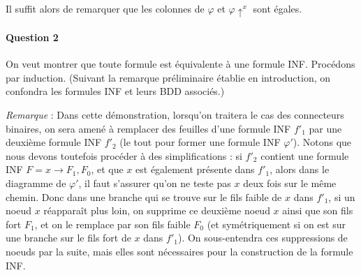 \documentclass[a4paper,11pt]{article}
\begin{document}
		Il suffit alors de remarquer que les colonnes de $\varphi$ et $\varphi\uparrow^{x}$ sont égales.
		
		\paragraph{Question 2}
	
		
		
		On veut montrer que toute formule est équivalente à une formule INF.
		Procédons par induction.
		(Suivant la remarque préliminaire établie en introduction, on confondra les formules INF et leurs BDD associés.)
		
		\emph{Remarque} :  Dans cette démonstration, lorsqu'on traitera le cas des connecteurs binaires, on sera amené à remplacer des feuilles d'une formule INF ${f'}_1$ par une deuxième formule INF ${f'}_2$ (le tout pour former une formule INF $\varphi'$).
		Notons que nous devons toutefois procéder à des simplifications : si ${f'}_2$ contient une formule INF $F = x \rightarrow F_1,F_0$, et que $x$ est également présente dans ${f'}_1$, alors dans le diagramme de $\varphi'$, il faut s'assurer qu'on ne teste pas $x$ deux fois sur le même chemin. Donc dans une branche qui se trouve sur le fils faible de $x$ dans ${f'}_1$, si un noeud $x$ réapparaît plus loin, on supprime ce deuxième noeud $x$ ainsi que son fils fort $F_1$, et on le remplace par son fils faible $F_0$ (et symétriquement si on est sur une branche sur le fils fort de $x$ dans ${f'}_1$). On sous-entendra ces suppressions de noeuds par la suite, mais elles sont nécessaires pour la construction de la formule INF.
		
\end{document}
